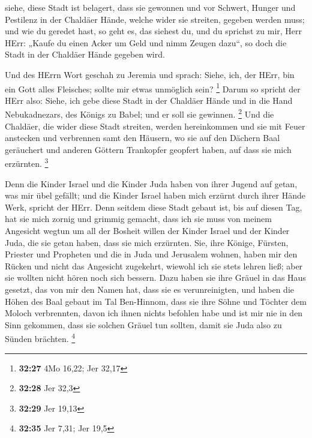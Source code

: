  siehe, diese Stadt ist belagert, dass sie gewonnen und vor
Schwert, Hunger und Pestilenz in der Chaldäer Hände, welche wider sie
streiten, gegeben werden muss; und wie du geredet hast, so geht es, das
siehest du,  und du sprichst zu mir, Herr HErr: „Kaufe du
einen Acker um Geld und nimm Zeugen dazu``, so doch die Stadt in der
Chaldäer Hände gegeben wird.

 Und des HErrn Wort geschah zu Jeremia und sprach:
 Siehe, ich, der HErr, bin ein Gott alles Fleisches; sollte
mir etwas unmöglich sein? \footnote{\textbf{32:27} 4Mo 16,22; Jer 32,17}
 Darum so spricht der HErr also: Siehe, ich gebe diese
Stadt in der Chaldäer Hände und in die Hand Nebukadnezars, des Königs zu
Babel; und er soll sie gewinnen. \footnote{\textbf{32:28} Jer 32,3}
 Und die Chaldäer, die wider diese Stadt streiten, werden
hereinkommen und sie mit Feuer anstecken und verbrennen samt den
Häusern, wo sie auf den Dächern Baal geräuchert und anderen Göttern
Trankopfer geopfert haben, auf dass sie mich erzürnten. \footnote{\textbf{32:29}
  Jer 19,13}

 Denn die Kinder Israel und die Kinder Juda haben von ihrer
Jugend auf getan, was mir übel gefällt; und die Kinder Israel haben mich
erzürnt durch ihrer Hände Werk, spricht der HErr.  Denn
seitdem diese Stadt gebaut ist, bis auf diesen Tag, hat sie mich zornig
und grimmig gemacht, dass ich sie muss von meinem Angesicht wegtun
 um all der Bosheit willen der Kinder Israel und der Kinder
Juda, die sie getan haben, dass sie mich erzürnten. Sie, ihre Könige,
Fürsten, Priester und Propheten und die in Juda und Jerusalem wohnen,
 haben mir den Rücken und nicht das Angesicht zugekehrt,
wiewohl ich sie stets lehren ließ; aber sie wollten nicht hören noch
sich bessern.  Dazu haben sie ihre Gräuel in das Haus
gesetzt, das von mir den Namen hat, dass sie es verunreinigten,
 und haben die Höhen des Baal gebaut im Tal Ben-Hinnom,
dass sie ihre Söhne und Töchter dem Moloch verbrennten, davon ich ihnen
nichts befohlen habe und ist mir nie in den Sinn gekommen, dass sie
solchen Gräuel tun sollten, damit sie Juda also zu Sünden brächten.
\footnote{\textbf{32:35} Jer 7,31; Jer 19,5}

